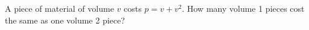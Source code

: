 A piece of material of volume $v$ costs $p=v+v^2$. How many volume 1 pieces cost the same as one volume 2 piece?
